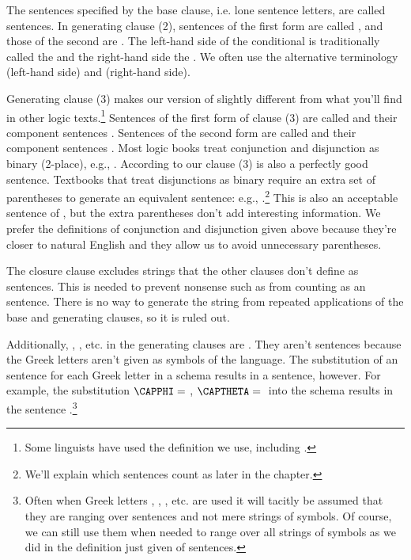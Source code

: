 The sentences specified by the base clause, i.e. lone sentence letters, are called  sentences.
In generating clause (2), sentences of the first form are called , and those of the second are . 
The left-hand side of the conditional is traditionally called the  and the right-hand side the . 
We often use the alternative terminology  (left-hand side) and  (right-hand side).

Generating clause (3) makes our version of \GSL{} slightly different from what you'll find in other logic texts.\footnote{Some linguists have used the definition we use, including \citealt{Gleitman1965}.} 
Sentences of the first form of clause (3) are called  and their component sentences . Sentences of the second form are called  and their component sentences . 
Most logic books treat conjunction and disjunction as binary (2-place), e.g., \mention{$\pardisjunction{\Al}{\Bl}$}. According to our clause (3) \mention{$\pardisjunction{\disjunction{\Al}{\Bl}}{\Cl}$} is also a perfectly good sentence. Textbooks that treat disjunctions as binary require an extra set of parentheses to generate an equivalent sentence: e.g., \mention{$\pardisjunction{\pardisjunction{\Al}{\Bl}}{\Cl}$}.\footnote{We'll explain which sentences count as  later in the chapter.} This is also an acceptable sentence of \GSL{}, but the extra parentheses don't add interesting information. We prefer the definitions of conjunction and disjunction given above because they're closer to natural English and they allow us to avoid unnecessary parentheses.

The closure clause excludes strings that the other clauses don't define as sentences. 
This is needed to prevent nonsense such as \mention{$(\Bl(\HORSESHOE{}\Al$} from counting as an \GSL{} sentence. 
There is no way to generate the string from repeated applications of the base and generating clauses, so it is ruled out. 

Additionally, \mention{$\negation{\CAPPHI}$}, \mention{$\parhorseshoe{\CAPPHI}{\CAPTHETA}$}, etc. in the generating clauses are . 
They aren't \GSL{} sentences because the Greek letters aren't given as symbols of the language. 
The substitution of an \GSL{} sentence for each Greek letter in a schema results in a \GSL{} sentence, however. 
For example, the substitution $\CAPPHI=\;$\mention{$\Al$}, $\CAPTHETA=\;$\mention{$\partriplebar{\Cl}{\Dl}$} into the schema \mention{$\parhorseshoe{\CAPPHI}{\CAPTHETA}$} results in the sentence \mention{$\parhorseshoe{\Al}{\partriplebar{\Cl}{\Dl}}$}.\footnote{Often when Greek letters \mention{$\CAPPHI$}, \mention{$\CAPPSI$}, \mention{$\CAPTHETA$}, etc. are used it will tacitly be assumed that they are ranging over \GSL{} sentences and not mere strings of \GSL{} symbols. 
Of course, we can still use them when needed to range over all strings of \GSL{} symbols as we did in the definition just given of \GSL{} sentences.}

